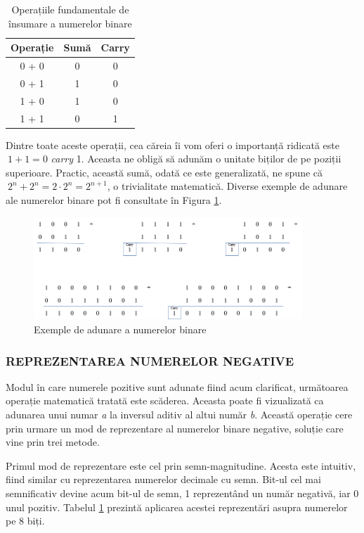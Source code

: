 \documentclass[12pt]{article}
\begin{document}
\begin{table}[h]
\centering
\caption{Operațiile fundamentale de însumare a numerelor binare }
\label{Tabela:4}
\begin{tabular}{ ||c|c|c|| }
 \hline
 Operație & Sumă & Carry \\ 
 \hline  \hline
 0 + 0 & 0 & 0\\
 \hline
 0 + 1 & 1  & 0\\
 \hline
 1 + 0 &  1 & 0 \\
 \hline
 1 + 1 & 0 & 1 \\
 \hline
\end{tabular}
\end{table}
Dintre toate aceste operații, cea căreia îi vom oferi o importanță ridicată este $\ 1 + 1 = 0$ \textit{carry} 1. Aceasta  ne obligă să adunăm o unitate biților de pe poziții superioare. Practic, această sumă, odată ce este generalizată, ne spune că $\ 2^n + 2^n = 2 \cdot 2^n = 2^{n+1}$, o trivialitate matematică. Diverse exemple de adunare ale numerelor binare pot fi consultate în Figura \ref{Figura:2}.

 \begin{figure}[h!]
 \includegraphics[width=0.9\textwidth]{binary_addition.png}
 \centering
 \caption{Exemple de adunare a numerelor binare}
 \label{Figura:2}
 \end{figure}

\subsubsection{REPREZENTAREA NUMERELOR NEGATIVE}
Modul în care numerele pozitive sunt adunate fiind acum clarificat, următoarea operație matematică tratată este scăderea. Aceasta poate fi vizualizată ca adunarea unui numar \textit{a} la inversul aditiv al altui număr \textit{b}.
Această operație cere prin urmare un mod de reprezentare al numerelor binare negative, soluție care vine prin trei metode.

Primul mod de reprezentare este cel prin semn-magnitudine. Acesta este intuitiv, fiind similar cu reprezentarea numerelor decimale cu semn. Bit-ul cel mai semnificativ devine acum bit-ul de semn, 1 reprezentând un număr negativă, iar 0 unul pozitiv. Tabelul \ref{Tabela:4} prezintă aplicarea acestei reprezentări asupra numerelor pe 8 biți.
\end{document}
